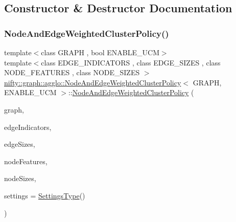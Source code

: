 \subsection{Constructor \& Destructor Documentation}
\mbox{\label{classnifty_1_1graph_1_1agglo_1_1NodeAndEdgeWeightedClusterPolicy_a7ba043c2461fc998dff07fa8c35c8f76}} 
\subsubsection{\texorpdfstring{Node\+And\+Edge\+Weighted\+Cluster\+Policy()}{NodeAndEdgeWeightedClusterPolicy()}}
{\footnotesize\ttfamily template$<$class G\+R\+A\+PH , bool E\+N\+A\+B\+L\+E\+\_\+\+U\+CM$>$ \\
template$<$class E\+D\+G\+E\+\_\+\+I\+N\+D\+I\+C\+A\+T\+O\+RS , class E\+D\+G\+E\+\_\+\+S\+I\+Z\+ES , class N\+O\+D\+E\+\_\+\+F\+E\+A\+T\+U\+R\+ES , class N\+O\+D\+E\+\_\+\+S\+I\+Z\+ES $>$ \\
\hyperlink{classnifty_1_1graph_1_1agglo_1_1NodeAndEdgeWeightedClusterPolicy}{nifty\+::graph\+::agglo\+::\+Node\+And\+Edge\+Weighted\+Cluster\+Policy}$<$ G\+R\+A\+PH, E\+N\+A\+B\+L\+E\+\_\+\+U\+CM $>$\+::\hyperlink{classnifty_1_1graph_1_1agglo_1_1NodeAndEdgeWeightedClusterPolicy}{Node\+And\+Edge\+Weighted\+Cluster\+Policy} (\begin{DoxyParamCaption}\item[{const \hyperlink{classnifty_1_1graph_1_1agglo_1_1NodeAndEdgeWeightedClusterPolicy_a293d476ffc7b8513eeb20c21bfefb579}{Graph\+Type} \&}]{graph,  }\item[{const E\+D\+G\+E\+\_\+\+I\+N\+D\+I\+C\+A\+T\+O\+RS \&}]{edge\+Indicators,  }\item[{const E\+D\+G\+E\+\_\+\+S\+I\+Z\+ES \&}]{edge\+Sizes,  }\item[{const N\+O\+D\+E\+\_\+\+F\+E\+A\+T\+U\+R\+ES \&}]{node\+Features,  }\item[{const N\+O\+D\+E\+\_\+\+S\+I\+Z\+ES \&}]{node\+Sizes,  }\item[{const \hyperlink{structnifty_1_1graph_1_1agglo_1_1NodeAndEdgeWeightedClusterPolicy_1_1SettingsType}{Settings\+Type} \&}]{settings = {\ttfamily \hyperlink{structnifty_1_1graph_1_1agglo_1_1NodeAndEdgeWeightedClusterPolicy_1_1SettingsType}{Settings\+Type}()} }\end{DoxyParamCaption})\hspace{0.3cm}{\ttfamily [inline]}}




